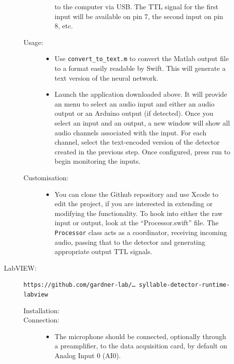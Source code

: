 \documentclass[10pt,letterpaper]{article}
\begin{document}
\begin{description}
\begin{description}
\begin{description}
\begin{itemize}
      to the computer via USB. The TTL signal for the first input will be available on 
      pin 7, the second input on pin 8, etc.
      \end{itemize}
    \item[Usage:]\hfill
      \begin{itemize}
      \item Use {\tt convert\_to\_text.m} to convert the Matlab output file to a format 
      easily readable by Swift. This will generate a text version of the neural network.
      \item Launch the application downloaded above. It will provide an 
      menu to select an audio input and either an audio output or an Arduino output (if 
      detected). Once you select an input and an output, a new window will show all audio 
      channels associated with the input. For each channel, select the text-encoded version of 
      the detector created in the previous step. Once configured, press run to begin 
      monitoring the inputs.
      \end{itemize}
    \item[Customisation:]\hfill
      \begin{itemize}
      \item You can clone the Github repository and use Xcode to edit the project, if you 
      are interested in extending or modifying the functionality. To hook into either 
      the raw input or output, look at the ``Processor.swift'' file. The 
      {\tt Processor} class acts as a coordinator, receiving incoming audio, passing that
      to the detector and generating appropriate output TTL signals.
      \end{itemize}
    \end{description}
  \item[LabVIEW:] {\tt https://github.com/gardner-lab/\dots\ syllable-detector-runtime-labview}
    \begin{description}
    \item[Installation:]\hfill
    \item[Connection:]\hfill
      \begin{itemize}
      \item The microphone should be connected, optionally through a preamplifier, to the data acquisition card, by default on Analog Input 0 (AI0).

\end{itemize}
\end{description}
\end{description}
\end{description}
\end{document}
